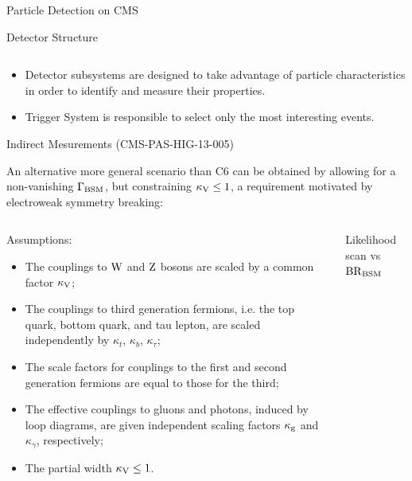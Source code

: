 \documentclass[8pt]{beamer}
\newcommand{\W}{{\rm W}}
\newcommand{\Z}{{\rm Z}}
\begin{document}
\begin{frame}{Particle Detection on CMS}
\begin{block}{Detector Structure}
\begin{columns}
    \end{columns}

  \end{block}

  \begin{itemize}
    \item Detector subsystems are designed to take advantage of particle characteristics in order to identify and measure
          their properties.
    \item Trigger System is responsible to select only the most interesting events.
  \end{itemize} 

\end{frame}

\begin{frame}{Indirect Mesurements (CMS-PAS-HIG-13-005)}
 
An alternative more general scenario than C6 can be obtained by allowing for a non-vanishing $\Gamma_{\rm{BSM}}$,
but constraining $\kappa_{\rm{V}} \le 1$, a requirement motivated by electroweak symmetry breaking:

\begin{columns}
 
\begin{block}{Assumptions:}

\begin{itemize}
\item The couplings to $\W$ and $\Z$ bosons are scaled by a common factor $\kappa_{\rm{V}}$;
\item The couplings to third generation fermions, i.e. the top quark, bottom quark, and tau lepton, are scaled independently by $\kappa_{t}$, $\kappa_{b}$, $\kappa_{\tau}$;
\item The scale factors for couplings to the first and second generation fermions are equal to those for the third;
\item The effective couplings to gluons and photons, induced by loop diagrams, are given independent scaling factors $\kappa_{\rm{g}}$ and $\kappa_{\gamma}$, respectively;
\item The partial width  $\kappa_{\rm{V}} \le 1$.
\end{itemize}

\end{block}
 
\begin{block}{Likelihood scan vs $\rm{BR}_{\rm{BSM}}$}


\end{block}
\end{columns}
\end{frame}
\end{document}
